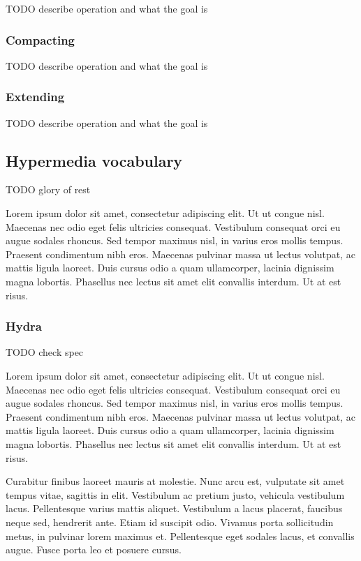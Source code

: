 TODO describe operation and what the goal is

\subsubsection{Compacting}\label{jsonldcompacting}

TODO describe operation and what the goal is

\subsubsection{Extending}\label{jsonldextending}

TODO describe operation and what the goal is

\subsection{Hypermedia vocabulary}

TODO glory of rest

Lorem ipsum dolor sit amet, consectetur adipiscing elit. Ut ut congue nisl. Maecenas nec odio eget felis ultricies consequat. Vestibulum consequat orci eu augue sodales rhoncus. Sed tempor maximus nisl, in varius eros mollis tempus. Praesent condimentum nibh eros. Maecenas pulvinar massa ut lectus volutpat, ac mattis ligula laoreet. Duis cursus odio a quam ullamcorper, lacinia dignissim magna lobortis. Phasellus nec lectus sit amet elit convallis interdum. Ut at est risus.

\subsubsection{Hydra}

TODO check spec

Lorem ipsum dolor sit amet, consectetur adipiscing elit. Ut ut congue nisl. Maecenas nec odio eget felis ultricies consequat. Vestibulum consequat orci eu augue sodales rhoncus. Sed tempor maximus nisl, in varius eros mollis tempus. Praesent condimentum nibh eros. Maecenas pulvinar massa ut lectus volutpat, ac mattis ligula laoreet. Duis cursus odio a quam ullamcorper, lacinia dignissim magna lobortis. Phasellus nec lectus sit amet elit convallis interdum. Ut at est risus.

Curabitur finibus laoreet mauris at molestie. Nunc arcu est, vulputate sit amet tempus vitae, sagittis in elit. Vestibulum ac pretium justo, vehicula vestibulum lacus. Pellentesque varius mattis aliquet. Vestibulum a lacus placerat, faucibus neque sed, hendrerit ante. Etiam id suscipit odio. Vivamus porta sollicitudin metus, in pulvinar lorem maximus et. Pellentesque eget sodales lacus, et convallis augue. Fusce porta leo et posuere cursus.

